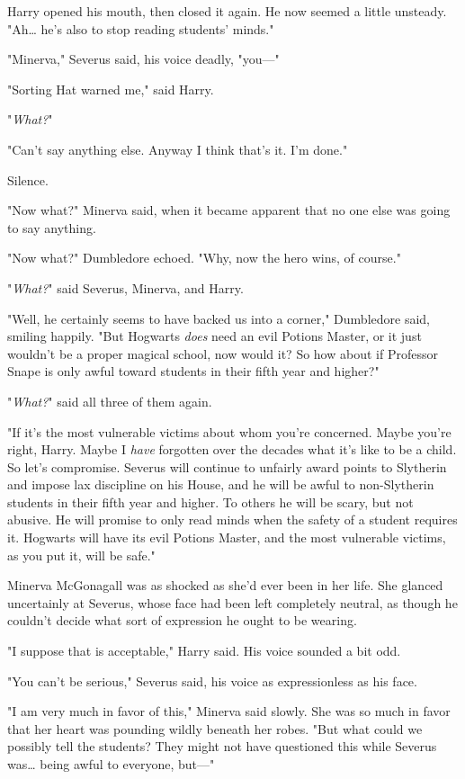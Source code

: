 Harry opened his mouth, then closed it again. He now seemed a little unsteady. 
"Ah{\ldots} he's also to stop reading students' minds."

"Minerva," Severus said, his voice deadly, "you---"

"Sorting Hat warned me," said Harry.

"\emph{What?}"

"Can't say anything else. Anyway I think that's it. I'm done."

Silence.

"Now what?" Minerva said, when it became apparent that no one else was going to 
say anything.

"Now what?" Dumbledore echoed. "Why, now the hero wins, of course."

"\emph{What?}" said Severus, Minerva, and Harry.

"Well, he certainly seems to have backed us into a corner," Dumbledore said, 
smiling happily. "But Hogwarts \emph{does} need an evil Potions Master, or it 
just wouldn't be a proper magical school, now would it? So how about if 
Professor Snape is only awful toward students in their fifth year and higher?"

"\emph{What?}" said all three of them again.

"If it's the most vulnerable victims about whom you're concerned. Maybe you're 
right, Harry. Maybe I \emph{have} forgotten over the decades what it's like to 
be a child. So let's compromise. Severus will continue to unfairly award points 
to Slytherin and impose lax discipline on his House, and he will be awful to 
non-Slytherin students in their fifth year and higher. To others he will be 
scary, but not abusive. He will promise to only read minds when the safety of a 
student requires it. Hogwarts will have its evil Potions Master, and the most 
vulnerable victims, as you put it, will be safe."

Minerva McGonagall was as shocked as she'd ever been in her life. She glanced 
uncertainly at Severus, whose face had been left completely neutral, as though 
he couldn't decide what sort of expression he ought to be wearing.

"I suppose that is acceptable," Harry said. His voice sounded a bit odd.

"You can't be serious," Severus said, his voice as expressionless as his face.

"I am very much in favor of this," Minerva said slowly. She was so much in 
favor that her heart was pounding wildly beneath her robes. "But what could we 
possibly tell the students? They might not have questioned this while Severus 
was{\ldots} being awful to everyone, but---"

